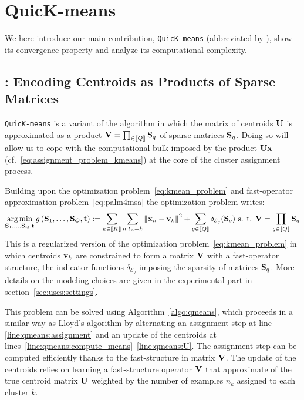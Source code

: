 
\section{QuicK-means}
\label{sec:contribution}

We here introduce our main contribution, \texttt{QuicK-means} (abbreviated by \qkmeans), 
show its convergence property and analyze its computational complexity.

\subsection{\qkmeans: Encoding Centroids as Products of Sparse Matrices}

\texttt{QuicK-means} is a variant of the \kmeans algorithm in which the matrix of centroids ${\mathbf{U}}$
is approximated as a product ${\mathbf{V}}=\prod_{\in\left \llbracket Q\right \rrbracket}{\mathbf{S}}_q$ of sparse matrices ${\mathbf{S}}_q$.
Doing so will allow us to cope with the computational bulk imposed by the product ${\mathbf{U}}{\mathbf{x}}$
(cf.~\eqref{eq:assignment_problem_kmeans}) at the core of the cluster assignment process.

Building upon the \kmeans optimization problem~\eqref{eq:kmean_problem} and fast-operator approximation problem~\eqref{eq:palm4msa} the \qkmeans optimization problem 
writes:
%
\begin{align}
\label{eq:qmean_problem}
 \operatorname*{arg\,min}_{{\mathbf{S}}_1, \ldots, {\mathbf{S}}_{Q}, {\mathbf{t}}} g\left({\mathbf{S}}_1, \ldots, {\mathbf{S}}_{Q}, {\mathbf{t}}\right)
    := \sum_{k\in\left \llbracket K\right \rrbracket}\sum_{n: t_n = k} \left\|{\mathbf{x}}_n -{\mathbf{v}}_k\right\|^2 + \sum_{q\in\left \llbracket Q\right \rrbracket} \delta_{\mathcal{E}_q}({\mathbf{S}}_q) \text{ s. t. } {\mathbf{V}} = \prod_{q\in\left \llbracket Q\right \rrbracket}{\mathbf{S}}_q
\end{align}
%
This is a regularized version of the \kmeans optimization problem~\eqref{eq:kmean_problem} in which centroids ${\mathbf{v}}_k$ are constrained to form a matrix ${\mathbf{V}}$ with a fast-operator structure, the indicator functions $\delta_{\mathcal{E}_q}$ imposing the sparsity of matrices ${\mathbf{S}}_q$.
More details on the modeling choices are given in the experimental part in section~\ref{sec:uses:settings}.

This problem can be solved using Algorithm~\ref{algo:qmeans},
which proceeds in a similar way as Lloyd's algorithm by alternating an assignment step at line \ref{line:qmeans:assignment} and an update of the centroids at lines~\ref{line:qmeans:compute_means}--\ref{line:qmeans:U}. The assignment step can be computed efficiently thanks to the fast-structure in matrix ${\mathbf{V}}$. The update of the centroids relies on learning a fast-structure operator ${\mathbf{V}}$ that approximate of the true centroid matrix ${\mathbf{U}}$ weighted by the number of examples $n_k$ assigned to each cluster $k$.

